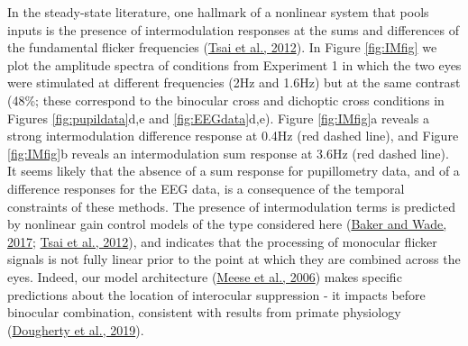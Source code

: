 \documentclass[
]{article}
\begin{document}
In the steady-state literature, one hallmark of a nonlinear system that pools inputs is the presence of intermodulation responses at the sums and differences of the fundamental flicker frequencies (\protect\hyperlink{ref-Tsai2012}{Tsai et al., 2012}). In Figure \ref{fig:IMfig} we plot the amplitude spectra of conditions from Experiment 1 in which the two eyes were stimulated at different frequencies (2Hz and 1.6Hz) but at the same contrast (48\%; these correspond to the binocular cross and dichoptic cross conditions in Figures \ref{fig:pupildata}d,e and \ref{fig:EEGdata}d,e). Figure \ref{fig:IMfig}a reveals a strong intermodulation difference response at 0.4Hz (red dashed line), and Figure \ref{fig:IMfig}b reveals an intermodulation sum response at 3.6Hz (red dashed line). It seems likely that the absence of a sum response for pupillometry data, and of a difference responses for the EEG data, is a consequence of the temporal constraints of these methods. The presence of intermodulation terms is predicted by nonlinear gain control models of the type considered here (\protect\hyperlink{ref-Baker2017}{Baker and Wade, 2017}; \protect\hyperlink{ref-Tsai2012}{Tsai et al., 2012}), and indicates that the processing of monocular flicker signals is not fully linear prior to the point at which they are combined across the eyes. Indeed, our model architecture (\protect\hyperlink{ref-Meese2006}{Meese et al., 2006}) makes specific predictions about the location of interocular suppression - it impacts before binocular combination, consistent with results from primate physiology (\protect\hyperlink{ref-Dougherty2019}{Dougherty et al., 2019}).
\end{document}
